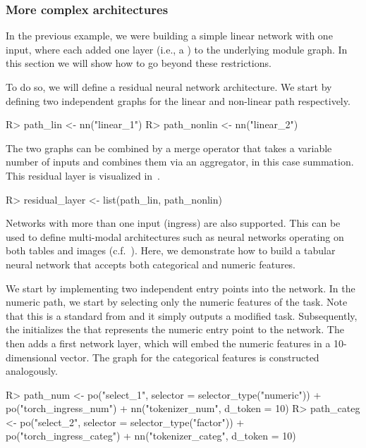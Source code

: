 \documentclass[article]{jss}
\theoremstyle{definition}
\begin{document}
\subsubsection{More complex architectures}\label{sec:complex-architectures}

In the previous example, we were building a simple linear network with one input, where each  added one layer (i.e., a ) to the underlying module graph.
In this section we will show how to go beyond these restrictions.

To do so, we will define a residual neural network architecture.
We start by defining two independent graphs for the linear and non-linear path respectively.

\begin{CodeInput}
R> path_lin <- nn("linear_1")
R> path_nonlin <- nn("linear_2") %
\end{CodeInput}

The two graphs can be combined by a merge operator that takes a variable number of inputs and combines them via an aggregator, in this case summation.
This residual layer is visualized in~.

\begin{CodeInput}
R> residual_layer <- list(path_lin, path_nonlin) %
\end{CodeInput}


Networks with more than one input (ingress) are also supported.
This can be used to define multi-modal architectures such as neural networks operating on both tables and images (c.f.~).
Here, we demonstrate how to build a tabular neural network that accepts both categorical and numeric features.

We start by implementing two independent entry points into the network.
In the numeric path, we start by selecting only the numeric features of the task.
Note that this is a standard  from  and it simply outputs a modified task.
Subsequently, the  initializes the  that represents the numeric entry point to the network.
The   \citep{gorishniy2021revisiting} then adds a first network layer, which will embed the numeric features in a 10-dimensional vector.
The graph for the categorical features is constructed analogously.

\begin{CodeInput}
R> path_num <- po("select_1", selector = selector_type("numeric")) %
+    po("torch_ingress_num") %
+    nn("tokenizer_num", d_token = 10)
R> path_categ <- po("select_2", selector = selector_type("factor")) %
+    po("torch_ingress_categ") %
+    nn("tokenizer_categ", d_token = 10)
\end{CodeInput}
\end{document}
